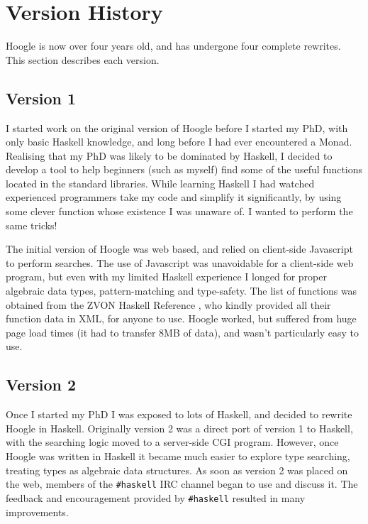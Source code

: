 \documentclass{tmr}
\begin{document}
\section{Version History}

Hoogle is now over four years old, and has undergone four complete rewrites. This section describes each version.

\subsection{Version 1}

I started work on the original version of Hoogle before I started my PhD, with only basic Haskell knowledge, and long before I had ever encountered a Monad. Realising that my PhD was likely to be dominated by Haskell, I decided to develop a tool to help beginners (such as myself) find some of the useful functions located in the standard libraries. While learning Haskell I had watched experienced programmers take my code and simplify it significantly, by using some clever function whose existence I was unaware of. I wanted to perform the same tricks!

The initial version of Hoogle was web based, and relied on client-side Javascript to perform searches. The use of Javascript was unavoidable for a client-side web program, but even with my limited Haskell experience I longed for proper algebraic data types, pattern-matching and type-safety. The list of functions was obtained from the ZVON Haskell Reference \cite{zvon}, who kindly provided all their function data in XML, for anyone to use. Hoogle worked, but suffered from huge page load times (it had to transfer 8MB of data), and wasn't particularly easy to use.

\subsection{Version 2}

Once I started my PhD I was exposed to lots of Haskell, and decided to rewrite Hoogle in Haskell. Originally version 2 was a direct port of version 1 to Haskell, with the searching logic moved to a server-side CGI program. However, once Hoogle was written in Haskell it became much easier to explore type searching, treating types as algebraic data structures. As soon as version 2 was placed on the web, members of the \verb"#haskell" IRC channel \cite{irc} began to use and discuss it. The feedback and encouragement provided by \verb"#haskell" resulted in many improvements.
\end{document}
